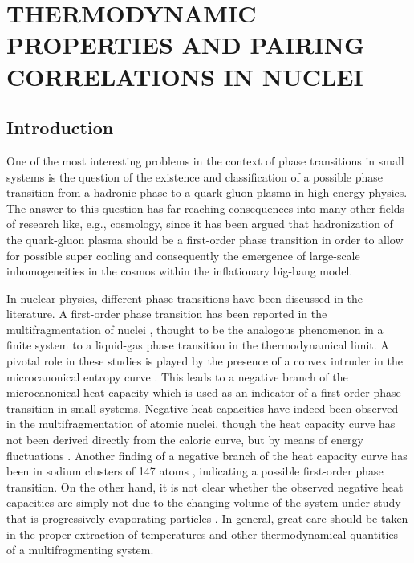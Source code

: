 \documentclass[rmp,preprint,aps,floatfix]{revtex4}
\begin{document}

%

\section{THERMODYNAMIC PROPERTIES AND PAIRING CORRELATIONS IN NUCLEI}
\label{sec:leveldensities_sec3}

\subsection{Introduction}

One of the 
most interesting problems in the context of phase transitions in small systems
is the question of the 
existence and classification of a possible phase transition from a hadronic 
phase to a quark-gluon plasma in high-energy physics. The answer to this 
question has far-reaching consequences into many other fields of research like,
e.g., cosmology, since it has been argued that hadronization of the quark-gluon
plasma should be a first-order phase transition in order to allow for possible 
super cooling and consequently the emergence of large-scale inhomogeneities in 
the cosmos within the inflationary big-bang model. 

In nuclear physics, different phase transitions have been discussed in the 
literature. A first-order phase transition has been reported in the 
multifragmentation of nuclei \cite{agostino00}, thought to be the analogous 
phenomenon in a finite system to a liquid-gas phase transition in the 
thermodynamical limit. A pivotal role in these studies is played by the 
presence of a convex intruder in the microcanonical entropy curve 
\cite{gross97,gross99}. This leads to a 
negative branch of the microcanonical heat 
capacity which is used as an indicator of a first-order phase transition in 
small systems. Negative heat capacities have indeed been observed in the 
multifragmentation of atomic nuclei, though the heat capacity curve has not 
been derived directly from the caloric curve, but by means of energy 
fluctuations \cite{agostino00,CD00}. 
Another finding of a negative branch of the heat
capacity curve has been in sodium clusters of 147 atoms \cite{schmidt01}, indicating
a possible first-order phase transition. On the other hand, it is not clear 
whether the observed negative heat capacities are simply not due to the changing 
volume of the system under study that is progressively evaporating particles 
\cite{moretto01}. In general, great care should be 
taken in the proper extraction of
temperatures and other thermodynamical quantities of a multifragmenting system.
\end{document}
